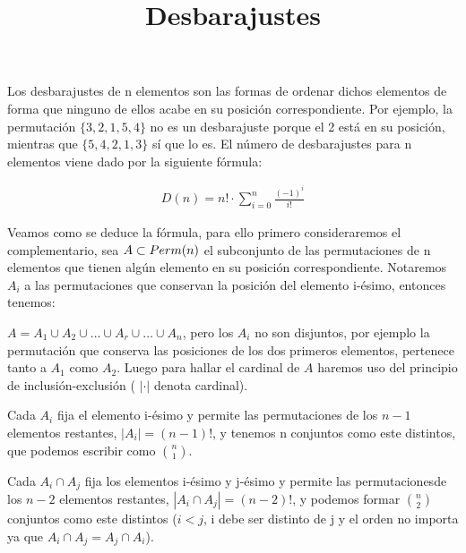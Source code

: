 \documentclass[12pt,spanish]{article}
\title{Desbarajustes}
\date{}
\theoremstyle{definition}
\theoremstyle{remark}
\begin{document}
\maketitle

\begin{justify}
  Los desbarajustes de n elementos son las formas de ordenar dichos
  elementos de forma que ninguno de ellos acabe en su posición
  correspondiente. Por ejemplo, la permutación $\{3,2,1,5,4\}$ no es
  un desbarajuste porque el 2 está en su posición, mientras que
  $\{5,4,2,1,3\}$ sí que lo es.  El número de desbarajustes para n
  elementos viene dado por la siguiente fórmula:
\end{justify}

\begin{align*}
  D(n)=n!\cdot\sum\limits_{i=0}^n\frac{(-1)^i}{i!}
\end{align*}

\begin{justify}
  Veamos como se deduce la fórmula, para ello primero consideraremos
  el complementario, sea $A\subset\mathnormal{Perm}(n)$ el subconjunto
  de las permutaciones de n elementos que tienen algún elemento en su
  posición correspondiente. Notaremos $A_i$ a las permutaciones que
  conservan la posición del elemento i-ésimo, entonces tenemos:
  
  $A=A_1\cup A_2\cup\ldots\cup A_r \cup\ldots\cup A_n$,
  pero los $A_i$
  no son disjuntos, por ejemplo la permutación que conserva las
  posiciones de los dos primeros elementos, pertenece tanto a $A_1$
  como $A_2$. Luego para hallar el cardinal de $A$ haremos uso del
  principio de inclusión-exclusión ( $|\cdot|$ denota cardinal).
\end{justify}

\begin{justify}
  Cada $A_i$ fija el elemento i-ésimo y permite las permutaciones de
  los $n-1$ elementos restantes, $|A_i|=(n-1)!$, y tenemos n conjuntos
  como este distintos, que podemos escribir como $\binom{n}{1}$.
\end{justify}

\begin{justify}
  Cada $A_i\cap A_j$ fija los elementos i-ésimo y j-ésimo y permite
  las permutacionesde los $n-2$ elementos restantes, $|A_i\cap
  A_j|=(n-2)!$, y podemos formar $\binom{n}{2}$ conjuntos como este
  distintos ($i<j$, i debe ser distinto de j y el orden no importa ya
  que $A_i\cap A_j =A_j\cap A_i$).
\end{justify}
\end{document}
